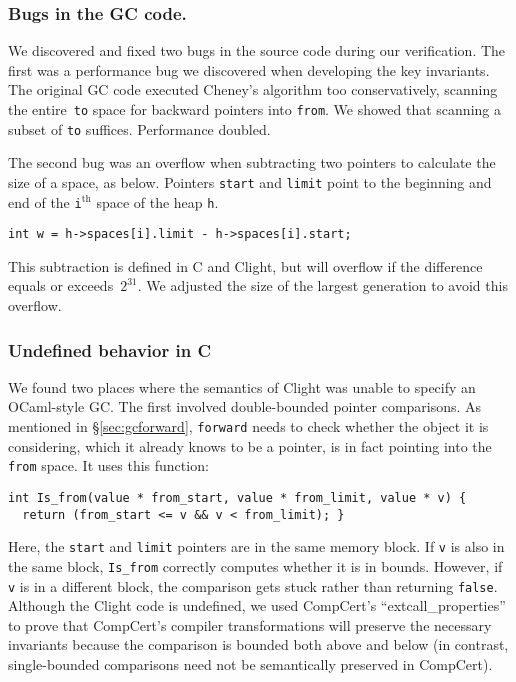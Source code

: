 \documentclass[acmsmall,review,anonymous]{acmart}\settopmatter{printfolios=true,printccs=false,printacmref=false}
\newcommand{\code}[1]{\texttt{\small #1}}
\begin{document}
\subsubsection*{Bugs in the GC code.}
We discovered and fixed two bugs in the source code during our verification.
The first was a performance bug we discovered when developing the key invariants.
The original GC code executed Cheney's algorithm too conservatively,
scanning the entire~\code{to} space for backward pointers into \code{from}. We
showed that scanning a subset of \code{to} suffices.  Performance doubled.

The second bug was an overflow when subtracting two pointers
to calculate the size of a space, as below. Pointers \code{start} and \code{limit}
point to the beginning and end of the \code{i}$^{\text{th}}$ space of the
heap \code{h}.
\begin{lstlisting}[numbers=none]
  int w = h->spaces[i].limit - h->spaces[i].start;
\end{lstlisting}
This subtraction is defined in C and Clight, but
will overflow if the difference equals
or exceeds~$2^{31}$. We adjusted the size of the largest generation to avoid this overflow.

\subsubsection*{Undefined behavior in C} We found two places where the semantics of Clight was unable to specify an OCaml-style GC.
The first involved double-bounded pointer comparisons.
As mentioned in \S\ref{sec:gcforward}, \code{forward} needs to
check whether the object it is considering, which it already knows to be a pointer,
is in fact pointing into the \code{from} space. It uses this function:
\begin{lstlisting}[numbers=none]
int Is_from(value * from_start, value * from_limit, value * v) {
  return (from_start <= v && v < from_limit); }
\end{lstlisting}
Here, the \code{start} and \code{limit} pointers are in the same
memory block. If \code{v} is also in the same block, \code{Is{\_}from}
correctly computes whether it is in bounds.
However, if \code{v} is in a different block, the comparison gets stuck rather than 
returning \code{false}.
Although the Clight code is undefined, we used CompCert's ``extcall{\_}properties''
to prove that CompCert's compiler transformations will preserve the necessary invariants
because the comparison is bounded both above and below (in contrast, single-bounded 
comparisons need not be semantically preserved in CompCert).
\end{document}
